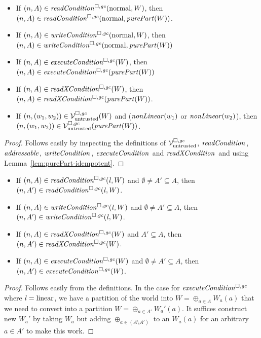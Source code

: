 \documentclass[a4paper]{article}
\begin{document}
\begin{lemma}
  \label{lem:non-linear-pure}

  \begin{itemize}
  \item If $\npair{A} \in \readCond{\normal,W}$, then $\npair{A} \in \readCond{}(\normal, \purePart{W} )$.
  \item If $\npair{A} \in \writeCond{\normal,W}$, then $\npair{A} \in \writeCond{}(\normal,\purePart{W})$
  \item If $\npair{A} \in \execCond{W}$, then $\npair{A} \in \execCond{}(\purePart{W})$
  \item If $\npair{A} \in \xReadCond{W}$, then $\npair{A} \in \xReadCond{}(\purePart{W} )$.
  \item If $\left(n,(w_1,w_2)\right) \in \mathcal{V}^{\square,\mathit{gc}}_{\mathrm{untrusted}}(W)$ and ($\nonLinear{w_1}$ or
    $\nonLinear{w_2}$), then
    $\npair{(w_1,w_2)} \in \lrv(\purePart{W})$.
  \end{itemize}
\end{lemma}
\begin{proof}
  Follows easily by inspecting the definitions of $\mathcal{V}^{\square,\mathit{gc}}_{\mathrm{untrusted}}$, $\readCond[]{}$, $\addressable{}$, $\writeCond[]{}$, $\execCond[]{}$ and $\xReadCond[]{}$ and using Lemma~\ref{lem:purePart-idempotent}.
\end{proof}

\begin{lemma}
  \label{lem:conds-shrinkable}
  \begin{itemize}
  \item If $\npair{A} \in \readCond{\lin,W}$  and $\emptyset \neq A' \subseteq A$, then
    $\npair{A'} \in \readCond{\lin,W}$.
  \item If $\npair{A} \in \writeCond{\lin,W}$  and $\emptyset \neq A' \subseteq A$, then
    $\npair{A'} \in \writeCond{\lin,W}$.
  \item If $\npair{A} \in \xReadCond{W}$  and $A' \subseteq A$, then
    $\npair{A'} \in \xReadCond{W}$.
  \item If $\npair{A} \in \execCond{W}$  and $\emptyset \neq A' \subseteq A$, then
    $\npair{A'} \in \execCond{W}$.
  \end{itemize}
\end{lemma}
\begin{proof}
  Follows easily from the definitions.
  In the case for $\execCond{}$ where $\mathit{l} = \mathrm{linear}$, we have a partition of the world into $W = \oplus_{a \in A} W_a(a)$ that we need to convert into a partition $W = \oplus_{a \in A'} W_a'(a)$.
  It suffices construct new $W_a'$ by taking $W_a$ but adding $\oplus_{a\in(A\setminus A')}$ to an $W_a(a)$ for an arbitrary $a \in A'$ to make this work.
\end{proof}
\end{document}
